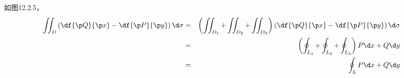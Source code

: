 \begin{center}
\end{center}

如图12.2.5，
\begin{eqnarray*}
	\iint_D\left(\df{\p Q}{\p x}-\df{\p P}{\p y}\right)\d\sigma&=&
	\left(\iint_{D_1}+\iint_{D_2}+\iint_{D_3}\right)\left(\df{\p Q}{\p x}-\df{\p
	P}{\p y}\right)\d\sigma\\
	&=&\left(\oint_{L_1}+\oint_{L_2}+\oint_{L_3}\right)P\d x+Q\d y\\
	&=&\oint_LP\d x+Q\d y
\end{eqnarray*}

